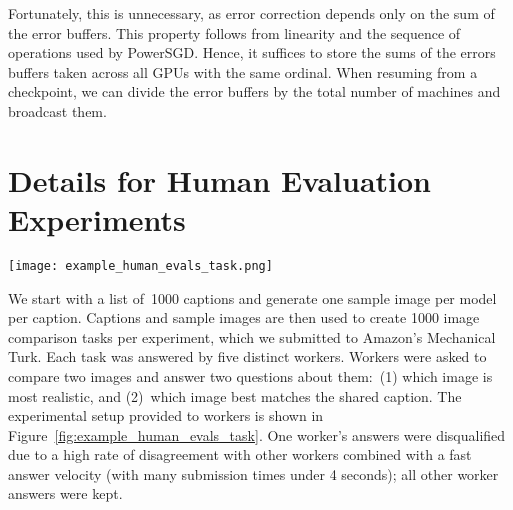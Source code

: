 \documentclass{article}
\begin{document}
\begin{enumerate}
    Fortunately, this is unnecessary, as error correction depends only on the sum of the error buffers. This property follows from linearity and the sequence of operations used by PowerSGD. Hence, it suffices to store the sums of the errors buffers taken across all GPUs with the same ordinal. When resuming from a checkpoint, we can divide the error buffers by the total number of machines and broadcast them.
\end{enumerate}

\section{Details for Human Evaluation Experiments}
\label{sec:human_eval}
\begin{figure*}[t]
    \centering
    \texttt{[image: example\_human\_evals\_task.png]}
    \caption{Example task interface shown to workers.}
    \label{fig:example_human_evals_task}
\end{figure*}
We start with a list of~\num{1000} captions and generate one sample image per model per caption. Captions and sample images are then used to create \num{1000} image comparison tasks per experiment, which we submitted to Amazon's Mechanical Turk. Each task was answered by five distinct workers. Workers were asked to compare two images and answer two questions about them:~(1) which image is most realistic, and (2)~which image best matches the shared caption. The experimental setup provided to workers is shown in Figure~\ref{fig:example_human_evals_task}. One worker's answers were disqualified due to a high rate of disagreement with other workers combined with a fast answer velocity (with many submission times under 4 seconds); all other worker answers were kept.
\end{document}
